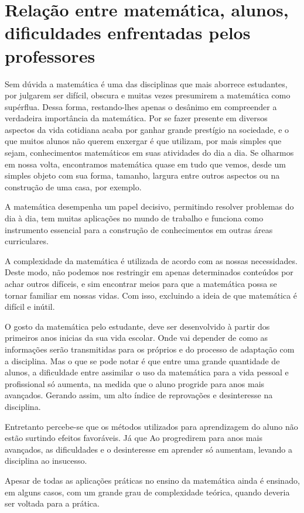 \documentclass[12pt,a4paper]{article}
\begin{document}
\section{Relação entre matemática, alunos, dificuldades enfrentadas pelos professores}
Sem dúvida a matemática é uma das disciplinas que mais aborrece estudantes, por julgarem ser difícil, obscura e muitas vezes presumirem a matemática como supérflua. Dessa forma, restando-lhes apenas o desânimo em compreender a verdadeira importância da matemática. Por se fazer presente em diversos aspectos da vida cotidiana acaba por ganhar grande prestígio na sociedade, e o que muitos alunos não querem enxergar é que utilizam, por mais simples que sejam, conhecimentos matemáticos em suas atividades do dia a dia. Se olharmos em nossa volta, encontramos matemática quase em tudo que vemos, desde um simples objeto com sua forma, tamanho, largura entre outros aspectos ou na construção de uma casa, por exemplo.

A matemática desempenha um papel decisivo, permitindo resolver problemas do dia à dia, tem muitas aplicações no mundo de trabalho e funciona como instrumento essencial para a construção de conhecimentos em outras áreas curriculares. \citep{nacionais1997secretaria}

A complexidade da matemática é utilizada de acordo com as nossas necessidades. Deste modo, não podemos nos restringir em apenas determinados conteúdos por achar outros difíceis, e sim encontrar meios para que a matemática possa se tornar familiar em nossas vidas. Com isso, excluindo a ideia de que matemática é difícil e inútil.

O gosto da matemática pelo estudante, deve ser desenvolvido à partir dos primeiros anos inicias da sua vida escolar. Onde vai depender de como as informações serão transmitidas para os próprios e do processo de adaptação com a disciplina. Mas o que se pode notar é que entre uma grande quantidade de alunos, a dificuldade entre assimilar o uso da matemática para a vida pessoal e profissional só aumenta, na medida que o aluno progride para anos mais avançados. Gerando assim, um alto índice de reprovações e desinteresse na disciplina. \citep{santosreprovaccao}

Entretanto percebe-se que os métodos utilizados para aprendizagem do aluno não estão surtindo efeitos favoráveis. Já que Ao progredirem para anos mais avançados, as dificuldades e o desinteresse em aprender só aumentam, levando a disciplina ao insucesso.

Apesar de todas as aplicações práticas no ensino da matemática ainda é ensinado, em
alguns casos, com um grande grau de complexidade teórica, quando deveria ser voltada para a prática. 
\end{document}
